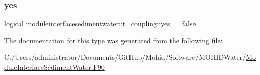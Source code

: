 \mbox{\label{structmoduleinterfacesedimentwater_1_1t__coupling_a6c208740b61176664022690909c31b2a}} 
\subsubsection{\texorpdfstring{yes}{yes}}
{\footnotesize\ttfamily logical moduleinterfacesedimentwater\+::t\+\_\+coupling\+::yes = .false.\hspace{0.3cm}{\ttfamily [private]}}



The documentation for this type was generated from the following file\+:\begin{DoxyCompactItemize}
\item 
C\+:/\+Users/administrator/\+Documents/\+Git\+Hub/\+Mohid/\+Software/\+M\+O\+H\+I\+D\+Water/\mbox{\hyperlink{_module_interface_sediment_water_8_f90}{Module\+Interface\+Sediment\+Water.\+F90}}\end{DoxyCompactItemize}
